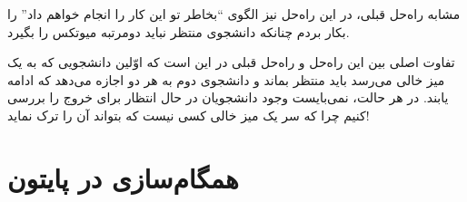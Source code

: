 \documentclass{book}
\newcommand{\clearemptydoublepage}{\newpage\cleardoublepage}
\begin{document}
    مشابه راه‌حل قبلی، در این راه‌حل نیز الگوی ``بخاطر تو این کار را انجام خواهم داد'' را بکار بردم چنانکه دانشجوی منتظر نباید دومرتبه میوتکس را بگیرد. 

    تفاوت اصلی بین این راه‌حل و راه‌حل قبلی در این است که اوّلین دانشجویی که به یک میز خالی می‌رسد باید منتظر بماند و دانشجوی دوم به هر دو اجازه 
    می‌دهد که ادامه یابند. در هر حالت، نمی‌بایست وجود دانشجویان در حال انتظار برای خروج را بررسی کنیم چرا که سر یک میز خالی کسی نیست که بتواند
    آن را ترک نماید!
    










\chapter{همگام‌سازی در پایتون}
\label{pysync}
\end{document}
